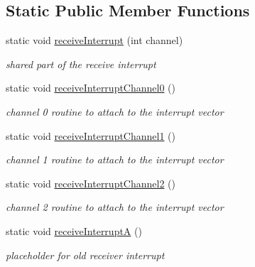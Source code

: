 \subsection*{Static Public Member Functions}
\begin{DoxyCompactItemize}
\item 
\mbox{\label{class_r_freceive_accecae78a1b37c6374ef287f2169aa65}} 
static void \mbox{\hyperlink{class_r_freceive_accecae78a1b37c6374ef287f2169aa65}{receive\+Interrupt}} (int channel)
\begin{DoxyCompactList}\small\item\em shared part of the receive interrupt \end{DoxyCompactList}\item 
\mbox{\label{class_r_freceive_a1f1c4ecbbafe17d4bebe3faedd9a6450}} 
static void \mbox{\hyperlink{class_r_freceive_a1f1c4ecbbafe17d4bebe3faedd9a6450}{receive\+Interrupt\+Channel0}} ()
\begin{DoxyCompactList}\small\item\em channel 0 routine to attach to the interrupt vector \end{DoxyCompactList}\item 
\mbox{\label{class_r_freceive_aeb586b7bb9cb2c30ea4fa2b70e4e4a61}} 
static void \mbox{\hyperlink{class_r_freceive_aeb586b7bb9cb2c30ea4fa2b70e4e4a61}{receive\+Interrupt\+Channel1}} ()
\begin{DoxyCompactList}\small\item\em channel 1 routine to attach to the interrupt vector \end{DoxyCompactList}\item 
\mbox{\label{class_r_freceive_a630b264c2715e88e950671b5e60fb283}} 
static void \mbox{\hyperlink{class_r_freceive_a630b264c2715e88e950671b5e60fb283}{receive\+Interrupt\+Channel2}} ()
\begin{DoxyCompactList}\small\item\em channel 2 routine to attach to the interrupt vector \end{DoxyCompactList}\item 
\mbox{\label{class_r_freceive_a6d80c25ebc975f71a4c9ec52b81df778}} 
static void \mbox{\hyperlink{class_r_freceive_a6d80c25ebc975f71a4c9ec52b81df778}{receive\+InterruptA}} ()
\begin{DoxyCompactList}\small\item\em placeholder for old receiver interrupt \end{DoxyCompactList}\end{DoxyCompactItemize}


